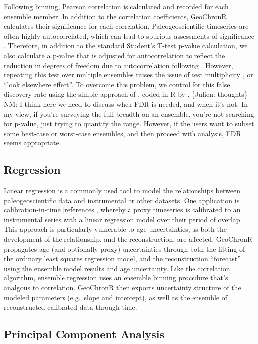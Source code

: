 \documentclass[gchron, manuscript]{copernicus}
\begin{document}
Following binning, Pearson correlation is calculated and recorded for each ensemble member.
In addition to the correlation coefficients, GeoChronR calculates their significance for each correlation.
Paleogeoscientific timeseries are often highly autocorrelated, which can lead to spurious assessments of significance \citep{Hu_epsl17}.
Therefore, in addition to the standard Student's T-test p-value calculation, we also calculate a p-value that is adjusted for autocorrelation to reflect the reduction in degrees of freedom due to autocorrelation following \citet{bretherton1999}.
However, repeating this test over multiple ensembles raises the issue of test multiplicity \citep{Ventura2004}, or ``look elsewhere effect''.
To overcome this problem, we control for this false discovery rate using the simple approach of \citet{BenjaminiHochberg95}, coded in R by \citet{Ventura2004}.
\{Julien: thoughts\} NM: I think here we need to discuss when FDR is needed, and when it's not. In my view, if you're surveying the full breadth on an ensemble, you're not searching for p-value, just trying to quantify the range. However, if the users want to subset some best-case or worst-case ensembles, and then proceed with analysis, FDR seems appropriate.

\subsection{Regression}

Linear regression is a commonly used tool to model the relationships between paleogeoscientific data and instrumental or other datasets.
One application is calibration-in-time {[}references{]}, whereby a proxy timeseries is calibrated to an instrumental series with a linear regression model over their period of overlap.
This approach is particularly vulnerable to age uncertainties, as both the development of the relationship, and the reconstruction, are affected.
GeoChronR propagates age (and optionally proxy) uncertainties through both the fitting of the ordinary least squares regression model, and the reconstruction ``forecast'' using the ensemble model results and age uncertainty.
Like the correlation algorithm, ensemble regression uses an ensemble binning procedure that's analgous to correlation.
GeoChronR then exports uncertainty structure of the modeled parameters (e.g.~slope and intercept), as well as the ensemble of reconstructed calibrated data through time.

\subsection{Principal Component Analysis}
\end{document}
